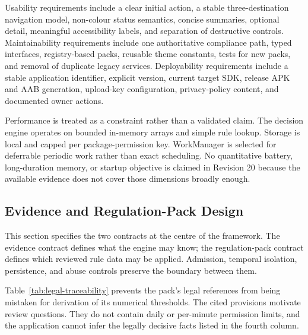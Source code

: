 Usability requirements include a clear initial action, a stable three-destination navigation model, non-colour status semantics, concise summaries, optional detail, meaningful accessibility labels, and separation of destructive controls. Maintainability requirements include one authoritative compliance path, typed interfaces, registry-based packs, reusable theme constants, tests for new packs, and removal of duplicate legacy services. Deployability requirements include a stable application identifier, explicit version, current target SDK, release APK and AAB generation, upload-key configuration, privacy-policy content, and documented owner actions.

Performance is treated as a constraint rather than a validated claim. The decision engine operates on bounded in-memory arrays and simple rule lookup. Storage is local and capped per package-permission key. WorkManager is selected for deferrable periodic work rather than exact scheduling. No quantitative battery, long-duration memory, or startup objective is claimed in Revision 20 because the available evidence does not cover those dimensions broadly enough.

\subsection{Evidence and Regulation-Pack Design}

This section specifies the two contracts at the centre of the framework. The evidence contract defines what the engine may know; the regulation-pack contract defines which reviewed rule data may be applied. Admission, temporal isolation, persistence, and abuse controls preserve the boundary between them.

Table~\ref{tab:legal-traceability} prevents the pack's legal references from being mistaken for derivation of its numerical thresholds. The cited provisions motivate review questions. They do not contain daily or per-minute permission limits, and the application cannot infer the legally decisive facts listed in the fourth column.

